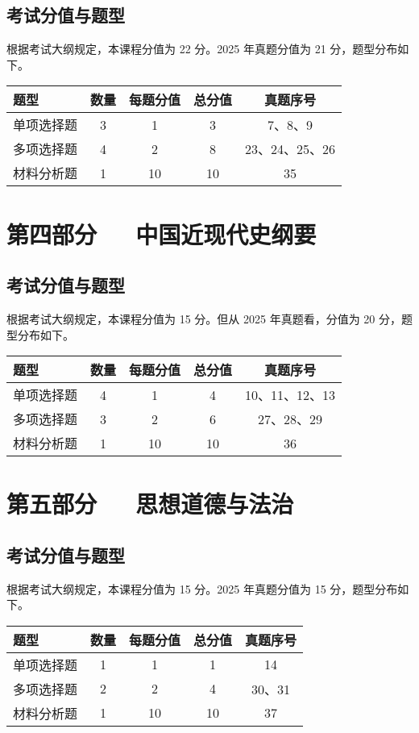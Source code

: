 \documentclass[UTF8]{ctexart}
\begin{document}
	\subsection*{考试分值与题型}
	根据考试大纲规定，本课程分值为 22 分。2025 年真题分值为 21 分，题型分布如下。
	\begin{table}[h]
		\centering
		\begin{tabular}{lcccc}
			\toprule
			题型 & 数量 & 每题分值 & 总分值 & 真题序号 \\
			\midrule
			单项选择题 & 3 & 1 & 3 & 7、8、9 \\
			多项选择题 & 4 & 2 & 8 & 23、24、25、26 \\
			材料分析题 & 1 & 10 & 10 & 35 \\
			\bottomrule
		\end{tabular}
	\end{table}
	
	\section*{\colorbox{green!50}{第四部分~~~\hfill 中国近现代史纲要}}
	
	\subsection*{考试分值与题型}
	根据考试大纲规定，本课程分值为 15 分。但从 2025 年真题看，分值为 20 分，题型分布如下。
	\begin{table}[h]
		\centering
		\begin{tabular}{lcccc}
			\toprule
			题型 & 数量 & 每题分值 & 总分值 & 真题序号 \\
			\midrule
			单项选择题 & 4 & 1 & 4 & 10、11、12、13 \\
			多项选择题 & 3 & 2 & 6 & 27、28、29 \\
			材料分析题 & 1 & 10 & 10 & 36 \\
			\bottomrule
		\end{tabular}
	\end{table}
	
	\section*{\colorbox{green!50}{第五部分~~~\hfill 思想道德与法治}}
	
	\subsection*{考试分值与题型}
	根据考试大纲规定，本课程分值为 15 分。2025 年真题分值为 15 分，题型分布如下。
	\begin{table}[h]
		\centering
		\begin{tabular}{lcccc}
			\toprule
			题型 & 数量 & 每题分值 & 总分值 & 真题序号 \\
			\midrule
			单项选择题 & 1 & 1 & 1 & 14 \\
			多项选择题 & 2 & 2 & 4 & 30、31 \\
			材料分析题 & 1 & 10 & 10 & 37 \\
			\bottomrule
		\end{tabular}
	\end{table}
	
\end{document}
